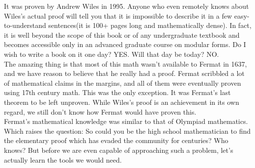 It was proven by Andrew Wiles in 1995. Anyone who even remotely knows about Wiles’s actual proof will tell you that it is impossible to describe it in a few easy-to-understand sentences(it is 100+ pages long and mathematically dense). In fact, it is well beyond the scope of this book or of any undergraduate textbook and becomes accessible only in an advanced graduate course on modular forms. Do I wish to write a book on it one day? YES. Will that day be today? NO.\\
The amazing thing is that most of this math wasn't available to Fermat in 1637, and we have reason to believe that he really had a proof. Fermat scribbled a lot of mathematical claims in the margins, and all of them were eventually proven using 17th century math. This was the only exception. It was Fermat's last theorem to be left unproven. While Wiles's proof is an achievement in its own regard, we still don't know how Fermat would have proven this.\\
Fermat's mathematical knowledge was similar to that of Olympiad mathematics. Which raises the question: So could you be the high school mathematician to find the elementary proof which has evaded the community for centuries? Who knows? But before we are even capable of approaching such a problem, let's actually learn the tools we would need.\\
